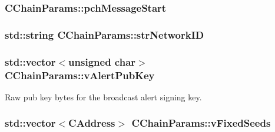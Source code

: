 \subsubsection[{pch\+Message\+Start}]{ C\+Chain\+Params\+::pch\+Message\+Start\hspace{0.3cm}{\ttfamily [protected]}}\label{class_c_chain_params_ae403e6b6d36b8f8c4d9d494cf686658c}
\hypertarget{class_c_chain_params_a8542ce21d5b9bdc2eadad8702fdd584a}{}
\subsubsection[{str\+Network\+I\+D}]{\setlength{\rightskip}{0pt plus 5cm}std\+::string C\+Chain\+Params\+::str\+Network\+I\+D\hspace{0.3cm}{\ttfamily [protected]}}\label{class_c_chain_params_a8542ce21d5b9bdc2eadad8702fdd584a}
\hypertarget{class_c_chain_params_adf435bdf2d9cd00936d7da0fb4237921}{}
\subsubsection[{v\+Alert\+Pub\+Key}]{\setlength{\rightskip}{0pt plus 5cm}std\+::vector$<$unsigned char$>$ C\+Chain\+Params\+::v\+Alert\+Pub\+Key\hspace{0.3cm}{\ttfamily [protected]}}\label{class_c_chain_params_adf435bdf2d9cd00936d7da0fb4237921}


Raw pub key bytes for the broadcast alert signing key. 

\hypertarget{class_c_chain_params_af3ad79fb5bf4938750317c91e4c4b954}{}
\subsubsection[{v\+Fixed\+Seeds}]{\setlength{\rightskip}{0pt plus 5cm}std\+::vector$<${\bf C\+Address}$>$ C\+Chain\+Params\+::v\+Fixed\+Seeds\hspace{0.3cm}{\ttfamily [protected]}}\label{class_c_chain_params_af3ad79fb5bf4938750317c91e4c4b954}
\hypertarget{class_c_chain_params_a9ce50b4162fb2ebf5bd72ad4045aa70c}{}
